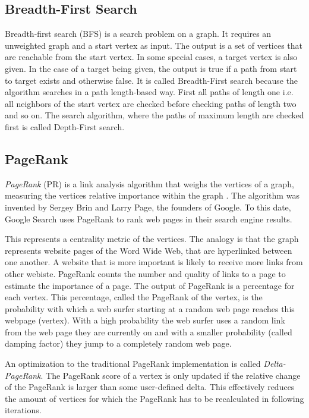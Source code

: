 \subsection{Breadth-First Search}
Breadth-first search (BFS) is a search problem on a graph.
It requires an unweighted graph and a start vertex as input.
The output is a set of vertices that are reachable from the start vertex.
In some special cases, a target vertex is also given. In the case of a target being given, the output is true if a path from start to target exists and otherwise false.
It is called Breadth-First search because the algorithm searches in a path length-based way. First all paths of length one i.e. all neighbors of the start vertex are checked before checking paths of length two and so on.
The search algorithm, where the paths of maximum length are checked first is called Depth-First search.

\subsection{PageRank}
\emph{PageRank} (PR) is a link analysis algorithm that weighs the vertices of a graph, measuring the vertices relative importance within the graph \cite{pagerank}.
The algorithm was invented by Sergey Brin and Larry Page, the founders of Google. To this date, Google Search uses PageRank to rank web pages in their search engine results.



This represents a centrality metric of the vertices.
The analogy is that the graph represents website pages of the Word Wide Web, that are hyperlinked between one another. A website that is more important is likely to receive more links from other webiste.
PageRank counts the number and quality of links to a page to estimate the importance of a page.
The output of PageRank is a percentage for each vertex. This percentage, called the PageRank of the vertex, is the probability with which a web surfer starting at a random web page reaches this webpage (vertex).
With a high probability the web surfer uses a random link from the web page they are currently on and with a smaller probability (called damping factor) they jump to a completely random web page.



An optimization to the traditional PageRank implementation is called \emph{Delta-PageRank}.
The PageRank score of a vertex is only updated if the relative change of the PageRank is larger than some user-defined delta.
This effectively reduces the amount of vertices for which the PageRank has to be recalculated in following iterations.

